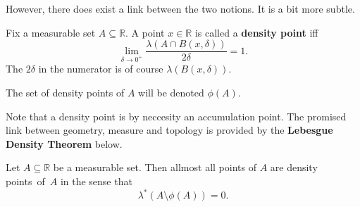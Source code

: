 However, there does exist a link between the two notions. It is a bit more subtle.

\begin{defn}
    Fix a measurable set \( A \subseteq \mathbb{R} \). A point \( x \in \mathbb{R} \) is called a \textbf{density point} iff
    \[ 
        \lim_{\delta \to 0^+} \frac{\lambda(A \cap B(x, \delta))}{2\delta} = 1.
   \]
   The \( 2\delta \) in the numerator is of course \( \lambda(B(x, \delta)) \).
\end{defn}
\begin{defn}
    The set of density points of \( A \) will be denoted \( \phi(A) \).
\end{defn}


Note that a density point is by neccesity an accumulation point. The promised link between geometry, measure and topology is provided by the \textbf{Lebesgue Density Theorem} below.
\begin{thm}\label{LebesgueDensityTheorem}
    Let \( A \subseteq \mathbb{R} \) be a measurable set. Then allmost all points of \( A \) are density points~of~\( A \) in the sense that 
    \ankimark
    \[ 
       \lambda^* (A \setminus \phi(A)) = 0. 
   \]
   
\end{thm}
